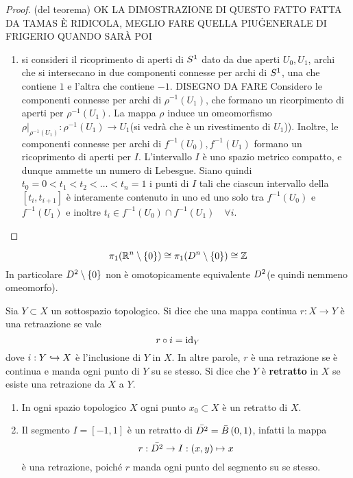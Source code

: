 \documentclass[]{article}
\begin{document}
\begin{proof} (del teorema) \nl
    OK LA DIMOSTRAZIONE DI QUESTO FATTO FATTA DA TAMAS \`E RIDICOLA, MEGLIO FARE QUELLA PIU\' GENERALE DI FRIGERIO QUANDO SAR\`A POI
    \begin{enumerate}
        \item si consideri il ricoprimento di aperti di $S^{1}$ dato da due aperti $U_0, U_1$, archi che si intersecano in due componenti 
        connesse per archi di $S^{1}$, una che contiene $1$ e l'altra che contiene $-1$. 
        \nl
        DISEGNO DA FARE
        \nl
        Considero le componenti connesse per archi di $\rho^{-1}(U_1)$, che formano un ricorpimento di aperti
        per $\rho^{-1}(U_1)$. La mappa $\rho$ induce un omeomorfismo 
        $\rho\big|_{\rho^{-1}(U_1)}: \rho^{-1}(U_1) \to U_1$(si vedr\`a che \`e un rivestimento di $U_1$)).
        \nl
        Inoltre, le componenti connesse per archi di $f^{-1}(U_0), f^{-1}(U_1)$ formano un ricoprimento di aperti per $I$.
        \nl
        L'intervallo $I$ \`e uno spazio metrico compatto, e dunque ammette un numero di Lebesgue. \nl
        Siano quindi $t_0 = 0 < t_1 < t_2 < \ldots < t_n = 1$ i punti di $I$ tali che
        ciascun intervallo della $\left[t_i, t_{i+1}\right]$ \`e interamente contenuto in uno
        ed uno solo tra  $f^{-1}(U_0)$ e $f^{-1}(U_1)$ e inoltre $t_i \in f^{-1}(U_0) \cap f^{-1}(U_1) \quad \forall i$.
        \nl
    \end{enumerate}
\end{proof}

\begin{corollary} \nl
    \[  
        \pi_1(\mathbb{R}^n \setminus \left\{ 0 \right\}) \cong \pi_1(D^n \setminus \left\{ 0 \right\}) \cong \mathbb{Z}
    \]
    In particolare $D^{2} \setminus \left\{ 0 \right\}$ non \`e omotopicamente equivalente $D^{2}$(e quindi nemmeno omeomorfo).
\end{corollary}

\begin{definition} [Retrazione] \nl
    Sia $Y \subset X$ un sottospazio topologico. Si dice che una mappa continua $r: X \to Y$ \`e una retraazione se vale
    \[
        r \circ i = \mathrm{id}_Y
    \]
    dove $i: Y \hookrightarrow X$ \`e l'inclusione di $Y$ in $X$. \nl 
    In altre parole, $r$ \`e una retrazione se \`e continua e manda ogni punto di $Y$ su se stesso. \nl
    Si dice che $Y$ \`e \textbf{retratto} in $X$ se esiste una retrazione da $X$ a $Y$.
\end{definition}

\begin{example}
    \begin{enumerate}
        \item  In ogni spazio topologico $X$ ogni punto ${x_0} \subset X$ \`e un retratto di $X$.
        \item  Il segmento $I = [-1, 1]$ \`e un retratto di $\bar{D^{2}} = \bar{B}\left(0, 1\right)$, infatti la mappa
            \[
                r: \bar{D^{2}} \to I: (x,y) \mapsto x
            \]
            \`e una retrazione, poich\'e $r$ manda ogni punto del segmento su se stesso.

    \end{enumerate}
\end{example}
\end{document}
